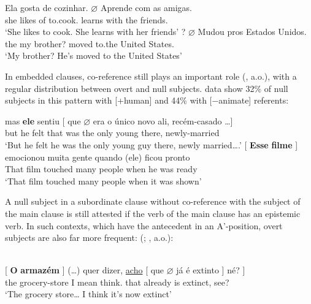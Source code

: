 \documentclass[output=paper]{langsci/langscibook}
\begin{document}
\ea%
    \label{ex:key:26.7}
    \ea
	\gll	Ela gosta de cozinhar. $\varnothing$ Aprende com as amigas.\\
    she likes of to.cook.      {}    learns    with the friends.\\
	\glt	\enquote*{She likes to cook. She learns with her friends}
    \ex
	? $\varnothing$  Mudou pros Estados Unidos.\\
    {} the my brother?  {} {}     moved to.the United States.\\
	\glt	\enquote*{My brother? He's moved to the United States}
    \z
\z

In embedded clauses, co-reference still plays an important role
(\citealt{Modesto2000,FigueiredoSilva2000,DuarteSoaresdaSilva2016}, a.o.), with
a regular distribution between overt and null subjects. 
data show 32\% of null subjects in this  pattern with [+human] and 44\%
with [−animate] referents:\newpage

\ea%
    \label{ex:key:26.8}
    \ea
	\gll	mas \textbf{ele}\textbf{}  sentiu [ que
    $\varnothing$  era  o    único novo    ali,
    recém-casado \dots{}]\\
            but  he  felt   {} that {} was the only   young there, newly-married \\
	\glt	\enquote*{But he felt he was the only young guy there, newly married….}
    \ex
	\gll	{}[ \textbf{Esse} \textbf{filme} ] emocionou muita  gente   quando (ele) ficou pronto\\
            {} That film {} touched many  people  when \hphantom{(}he  was ready\\
	\glt	\enquote*{That film touched many  people when it was shown}
    \z
\z

A null subject in a subordinate clause without co-reference with the subject of
the main clause is still attested if the verb of the main clause has an
epistemic verb. In such contexts, which have the antecedent in an A’-position,
overt subjects are also far more frequent: (\citealt{MoreiradaSilva1983};
\citealt{FigueiredoSilva1996,FigueiredoSilva2000}, a.o.):

\ea\label{ex:key:26.9}\\
    \gll	{}[ \textbf{O} \textbf{armazém} ] (\dots{}) {quer dizer,} \underline{acho} [ que $\varnothing$ já é extinto ] né? ]\\
    {} the grocery-store {} {} {I mean} think.\Fsg{} {} that {}  already is extinct, {} see?\\
    \glt	\enquote*{The grocery store\dots{} I think it's now extinct}
\z
\end{document}
